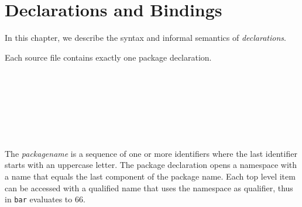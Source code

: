 

\chapter{Declarations and Bindings} \label{declarations}
  

In this chapter, we describe the syntax and informal semantics of \frege{} \emph{declarations}.

Each source file contains exactly one package declaration.

\begin{flushleft}
    \bracea{}  \bracez{}
  \alt {}  \sym{;}  \\
 
  \alt {}  
  \alt {}  \\
 
  \alt {} \sym{;} \\
  
  \alt {}        
  \alt {}          
  \alt {}          
  \alt {}         
  \alt {}          
  \alt {}        
  \alt {}\\
     
  \alt  {}          
  \alt  {}        \\
 \\

\end{flushleft}

The \emph{packagename} is a sequence of one or more identifiers where the last identifier starts with an uppercase letter.
The package declaration opens a namespace with a name that equals the last component of the package name.
Each top level item can be accessed with a qualified name that uses the namespace as qualifier, thus in
\texttt{bar} evaluates to 66.

